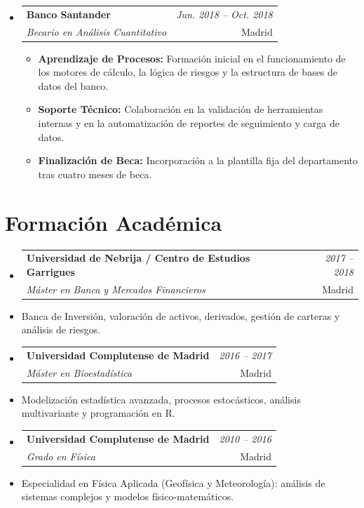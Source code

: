 \documentclass[a4paper,12pt]{article}
\makeatletter
\newcommand{\resumeSubheading}[4]{
\vspace{1.5mm}\item 
    \begin{tabular*}{0.98\textwidth}[t]{l@{\extracolsep{\fill}}r}
        \textbf{#1} & \textit{\small #4} \\ 
        \textit{\small #3} &  \small #2\\
    \end{tabular*}
    \vspace{-1.5mm}
}
\newcommand{\resumeItemListStart}{\begin{itemize}[leftmargin=3.5ex, labelsep=1.2mm, itemsep=0.3mm]\small}
\newcommand{\resumeItemListEnd}{\end{itemize}\vspace{-1mm}}
\makeatother
\begin{document}
\begin{itemize}[leftmargin=*,labelsep=0mm]
    \resumeSubheading
      {Banco Santander}{Madrid}
      {Becario en Análisis Cuantitativo}{Jun. 2018 -- Oct. 2018}
      \resumeItemListStart
       \item \textbf{Aprendizaje de Procesos:} Formación inicial en el funcionamiento de los motores de cálculo, la lógica de riesgos y la estructura de bases de datos del banco.
       \item \textbf{Soporte Técnico:} Colaboración en la validación de herramientas internas y en la automatización de reportes de seguimiento y carga de datos.
       \item \textbf{Finalización de Beca:} Incorporación a la plantilla fija del departamento tras cuatro meses de beca.
      \resumeItemListEnd
  \end{itemize}

\section{Formación Académica}
  \begin{itemize}[leftmargin=*,labelsep=0mm]
    \resumeSubheading
      {Universidad de Nebrija / Centro de Estudios Garrigues}{Madrid}
      {Máster en Banca y Mercados Financieros}{2017 -- 2018}
      \item[] \hspace{3.5ex} \small{Banca de Inversión, valoración de activos, derivados, gestión de carteras y análisis de riesgos.}

    \resumeSubheading
      {Universidad Complutense de Madrid}{Madrid}
      {Máster en Bioestadística}{2016 -- 2017}
      \item[] \hspace{3.5ex} \small{Modelización estadística avanzada, procesos estocásticos, análisis multivariante y programación en R.}

    \resumeSubheading
      {Universidad Complutense de Madrid}{Madrid}
      {Grado en Física}{2010 -- 2016}
      \item[] \hspace{3.5ex} \small{Especialidad en Física Aplicada (Geofísica y Meteorología): análisis de sistemas complejos y modelos físico-matemáticos.}
  \end{itemize}

\end{document}
